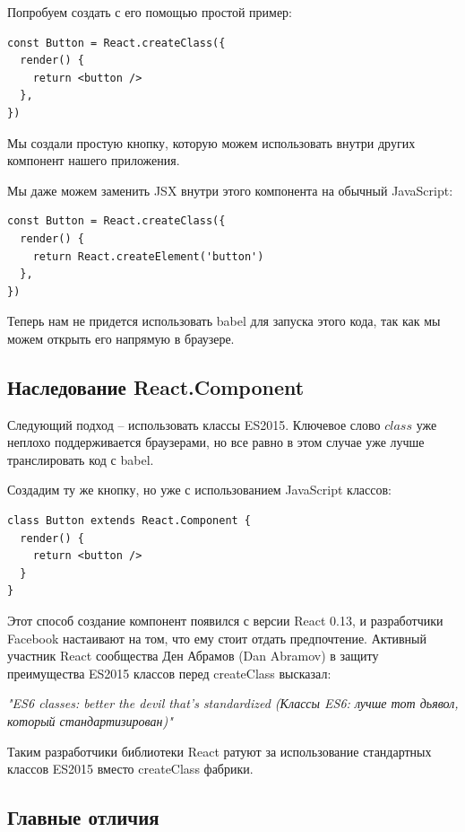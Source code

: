Попробуем создать с его помощью простой пример:

\begin{lstlisting}
const Button = React.createClass({
  render() {
    return <button />
  },
})
\end{lstlisting}

Мы создали простую кнопку, которую можем использовать внутри других компонент нашего приложения.

Мы даже можем заменить JSX внутри этого компонента на обычный JavaScript:

\begin{lstlisting}
const Button = React.createClass({
  render() {
    return React.createElement('button')
  },
})
\end{lstlisting}

Теперь нам не придется использовать babel для запуска этого кода, так как мы можем открыть его напрямую в браузере.

\subsection{Наследование React.Component}

Следующий подход -- использовать классы ES2015. Ключевое слово $class$ уже неплохо поддерживается браузерами, но все равно в этом случае уже лучше транслировать код с babel.

Создадим ту же кнопку, но уже с использованием JavaScript классов:

\begin{lstlisting}
class Button extends React.Component {
  render() {
    return <button />
  }
}
\end{lstlisting}

Этот способ создание компонент появился с версии React 0.13, и разработчики Facebook настаивают на том, что ему стоит отдать предпочтение. Активный участник React сообщества Ден Абрамов (Dan Abramov) в защиту преимущества ES2015 классов перед createClass высказал: 

\textit{"ES6 classes: better the devil that's standardized (Классы ES6: лучше тот дьявол, который стандартизирован)"}

Таким разработчики библиотеки React ратуют за использование стандартных классов ES2015 вместо createClass фабрики. 

\subsection{Главные отличия}

